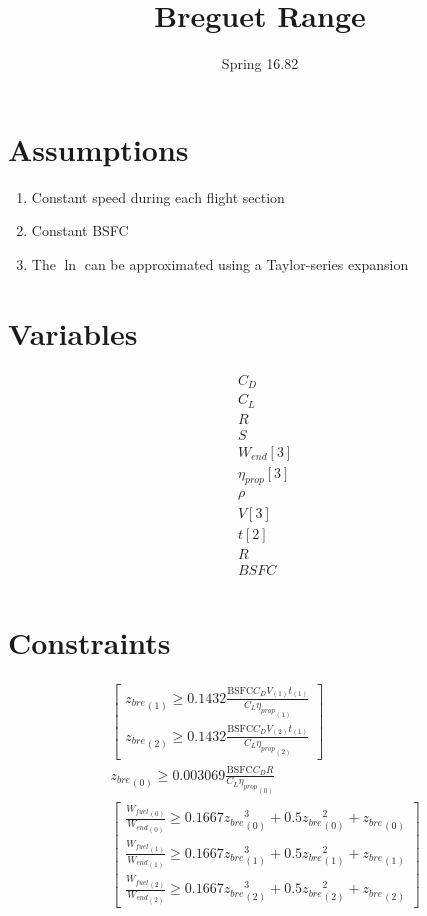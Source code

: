 \documentclass[10pt, a4paper]{article}
\begin{document}
\title{Breguet Range}
\author{Spring 16.82}
\maketitle

\section*{Assumptions} 

\begin{enumerate}

\item Constant speed during each flight section
\item Constant BSFC
\item The $\ln$ can be approximated using a Taylor-series expansion 

\end{enumerate}

\section*{Variables}

\[\begin{array}{ll}
    & C_D \\
    & C_L\\
    & R \\
    & S \\
    & W_{end}[3]\\
    & \eta_{prop}[3]\\
    & \rho \\
    & V[3] \\
    & t[2] \\
    & R \\
    & BSFC \\
\end{array} \]

\section*{Constraints}

\[ \begin{array}{ll}
	& \begin{bmatrix}{z_{bre}}_{(1)} \geq 0.1432\frac{\text{BSFC} C_D {V}_{(1)} {t}_{(1)}}{C_L {\eta_{prop}}_{(1)}} \\ {z_{bre}}_{(2)} \geq 0.1432\frac{\text{BSFC} C_D {V}_{(2)} {t}_{(1)}}{C_L {\eta_{prop}}_{(2)}}\end{bmatrix} \\
	& {z_{bre}}_{(0)} \geq 0.003069\frac{\text{BSFC} C_D R}{C_L {\eta_{prop}}_{(0)}} \\
	& \begin{bmatrix}\frac{{W_{fuel}}_{(0)}}{{W_{end}}_{(0)}} \geq 0.1667{z_{bre}}_{(0)}^{3} + 0.5{z_{bre}}_{(0)}^{2} + {z_{bre}}_{(0)} \\ \frac{{W_{fuel}}_{(1)}}{{W_{end}}_{(1)}} \geq 0.1667{z_{bre}}_{(1)}^{3} + 0.5{z_{bre}}_{(1)}^{2} + {z_{bre}}_{(1)} \\ \frac{{W_{fuel}}_{(2)}}{{W_{end}}_{(2)}} \geq 0.1667{z_{bre}}_{(2)}^{3} + 0.5{z_{bre}}_{(2)}^{2} + {z_{bre}}_{(2)}\end{bmatrix} \\
\end{array} \]
\end{document}
